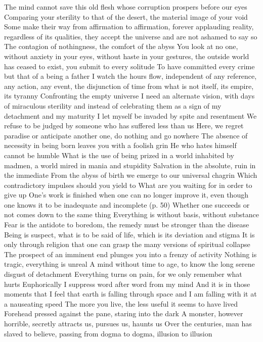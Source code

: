 \documentclass{article}
\begin{document}
The mind cannot save this old flesh whose corruption prospers before our eyes
Comparing your sterility to that of the desert, the material image of your void
Some make their way from affirmation to affirmation, forever applauding reality, regardless of its qualities, they accept the universe and are not ashamed to say so
The contagion of nothingness, the comfort of the abyss
You look at no one, without anxiety in your eyes, without haste in your gestures, the outside world has ceased to exist, you submit to every solitude
To have committed every crime but that of a being a father
I watch the hours flow, independent of any reference, any action, any event, the disjunction of time from what is not itself, its empire, its tyranny
Confronting the empty universe
I need an alternate vision, with days of miraculous sterility and instead of celebrating them as a sign of my detachment and my maturity
I let myself be invaded by spite and resentment
We refuse to be judged by someone who has suffered less than us
Here, we regret paradise or anticipate another one, do nothing and go nowhere
The absence of necessity in being born leaves you with a foolish grin
He who hates himself cannot be humble
What is the use of being prized in a world inhabited by madmen, a world mired in mania and stupidity
Salvation in the absolute, ruin in the immediate
From the abyss of birth we emerge to our universal chagrin
Which contradictory impulses should you yield to
What are you waiting for in order to give up
One's work is finished when one can no longer improve it, even though one knows it to be inadequate and incomplete (p. 50)
Whether one succeeds or not comes down to the same thing
Everything is without basis, without substance
Fear is the antidote to boredom, the remedy must be stronger than the disease
Being is suspect, what is to be said of life, which is its deviation and stigma
It is only through religion that one can grasp the many versions of spiritual collapse
The prospect of an imminent end plunges you into a frenzy of activity
Nothing is tragic, everything is unreal
A mind without time to age, to know the long serene disgust of detachment
Everything turns on pain, for we only remember what hurts
Euphorically I suppress word after word from my mind
And it is in those moments that I feel that earth is falling through space and I am falling with it at a nauseating speed
The more you live, the less useful it seems to have lived
Forehead pressed against the pane, staring into the dark
A monster, however horrible, secretly attracts us, pursues us, haunts us
Over the centuries, man has slaved to believe, passing from dogma to dogma, illusion to illusion
\end{document}
